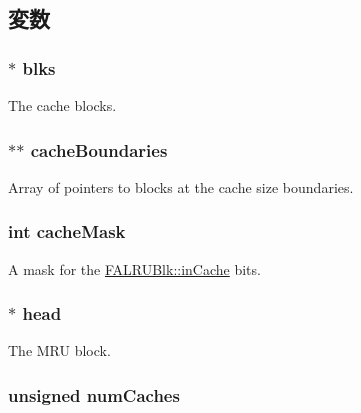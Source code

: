 \subsection{変数}
\hypertarget{classFALRU_a7493a5b25265aaedfdcf4de5febf03e7}{
\subsubsection[{blks}]{$\ast$ {\bf blks}}}
\label{classFALRU_a7493a5b25265aaedfdcf4de5febf03e7}
The cache blocks. \hypertarget{classFALRU_a5d339ffbb2b7d1fc126327a7eaecedc9}{
\subsubsection[{cacheBoundaries}]{$\ast$$\ast$ {\bf cacheBoundaries}}}
\label{classFALRU_a5d339ffbb2b7d1fc126327a7eaecedc9}
Array of pointers to blocks at the cache size boundaries. \hypertarget{classFALRU_abf2fa43889270cf9cc3906c2347bc837}{
\subsubsection[{cacheMask}]{\setlength{\rightskip}{0pt plus 5cm}int {\bf cacheMask}}}
\label{classFALRU_abf2fa43889270cf9cc3906c2347bc837}
A mask for the \hyperlink{classFALRUBlk_ac6da16cc60d372d1160776a7dbd19225}{FALRUBlk::inCache} bits. \hypertarget{classFALRU_a5827e7c04ec688fa822655255fb9643d}{
\subsubsection[{head}]{$\ast$ {\bf head}}}
\label{classFALRU_a5827e7c04ec688fa822655255fb9643d}
The MRU block. \hypertarget{classFALRU_ae8d599d08408b7259ec22ce188c8a936}{
\subsubsection[{numCaches}]{\setlength{\rightskip}{0pt plus 5cm}unsigned {\bf numCaches}}}
